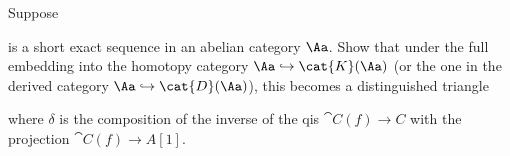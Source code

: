 \begin{exercise!}\label{SES-TRI}
    Suppose
    \begin{center}
    \end{center}
        is a short exact sequence in an abelian category $\Aa$.
        Show that under the full embedding into the
        homotopy category $\Aa \hookrightarrow \cat{K}(\Aa)$
        (or the one in the derived category $\Aa \hookrightarrow \cat{D}(\Aa)$),
        this becomes a distinguished triangle 
    \begin{center}
    \end{center}
        where $\delta$ is the composition of the inverse
        of the qis $\cat{C}(f) \to C$ with the projection $\cat{C}(f) \to A[1]$.
        

\end{exercise!}

